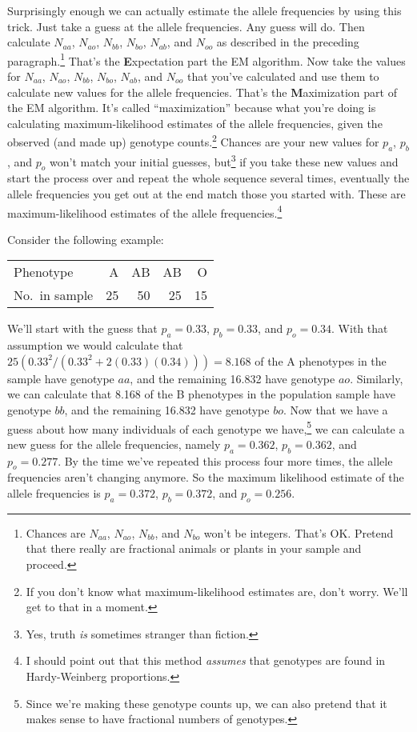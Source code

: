 \documentclass[12pt]{article}
\begin{document}
Surprisingly enough we can actually estimate the allele frequencies by
using this trick. Just take a guess at the allele frequencies. Any
guess will do. Then calculate $N_{aa}$, $N_{ao}$, $N_{bb}$, $N_{bo}$,
$N_{ab}$, and $N_{oo}$ as described in the preceding
paragraph.\footnote{Chances are $N_{aa}$, $N_{ao}$, $N_{bb}$, and
  $N_{bo}$ won't be integers. That's OK. Pretend that there really are
  fractional animals or plants in your sample and proceed.} That's the
{\bf E}xpectation part the EM algorithm. Now take the values for
$N_{aa}$, $N_{ao}$, $N_{bb}$, $N_{bo}$, $N_{ab}$, and $N_{oo}$ that
you've calculated and use them to calculate new values for the allele
frequencies. That's the {\bf M}aximization part of the EM
algorithm. It's called ``maximization'' because what you're doing is
calculating maximum-likelihood estimates of the allele frequencies,
given the observed (and made up) genotype counts.\footnote{If you
  don't know what maximum-likelihood estimates are, don't worry. We'll
  get to that in a moment.} Chances are your new values for $p_a$,
$p_b$, and $p_o$ won't match your initial guesses, but\footnote{Yes,
  truth {\it is\/} sometimes stranger than fiction.}  if you take
these new values and start the process over and repeat the whole
sequence several times, eventually the allele frequencies you get out
at the end match those you started with. These are maximum-likelihood
estimates of the allele frequencies.\footnote{I should point out that
  this method {\it assumes\/} that genotypes are found in
  Hardy-Weinberg proportions.}

Consider the following example:
\begin{center}
\begin{tabular}{l|rrrr}
\hline\hline
Phenotype      & A      & AB      & AB     & O  \\
No.\ in sample & 25     & 50      & 25     & 15 \\
\hline
\end{tabular}
\end{center}
We'll start with the guess that $p_a = 0.33$, $p_b = 0.33$, and $p_o =
0.34$. With that assumption we would calculate that $25(0.33^2/(0.33^2
+ 2(0.33)(0.34))) = 8.168$ of the A phenotypes in the sample have
genotype $aa$, and the remaining 16.832 have genotype $ao$. Similarly,
we can calculate that 8.168 of the B phenotypes in the population
sample have genotype $bb$, and the remaining 16.832 have genotype
$bo$. Now that we have a guess about how many individuals of each
genotype we have,\footnote{Since we're making these genotype counts
  up, we can also pretend that it makes sense to have fractional
  numbers of genotypes.} we can calculate a new guess for the allele
frequencies, namely $p_a = 0.362$, $p_b = 0.362$, and $p_o =
0.277$. By the time we've repeated this process four more times, the
allele frequencies aren't changing anymore. So the maximum likelihood
estimate of the allele frequencies is $p_a = 0.372$, $p_b = 0.372$,
and $p_o = 0.256$.
\end{document}
